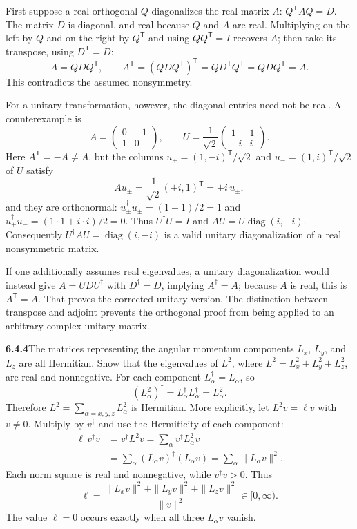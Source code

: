 First suppose a real orthogonal $Q$ diagonalizes the real matrix $A$:
$Q^{\mathsf T}AQ=D$. The matrix $D$ is diagonal, and real because $Q$
and $A$ are real. Multiplying on the left by $Q$ and on the right by
$Q^{\mathsf T}$ and using $QQ^{\mathsf T}=I$ recovers $A$; then take
its transpose, using $D^{\mathsf T}=D$:
\[
A=QDQ^{\mathsf T},\qquad
A^{\mathsf T}=(QDQ^{\mathsf T})^{\mathsf T}
=QD^{\mathsf T}Q^{\mathsf T}=QDQ^{\mathsf T}=A.
\]
This contradicts the assumed nonsymmetry.

For a unitary transformation, however, the diagonal entries need not
be real. A counterexample is
\[
A=\begin{pmatrix}0&-1\\1&0\end{pmatrix},\qquad
U=\frac1{\sqrt2}\begin{pmatrix}1&1\\-i&i\end{pmatrix}.
\]
Here $A^{\mathsf T}=-A\ne A$, but the columns
$u_+=(1,-i)^{\mathsf T}/\sqrt2$ and
$u_-=(1,i)^{\mathsf T}/\sqrt2$ of $U$ satisfy
\[
Au_\pm=\frac1{\sqrt2}(\pm i,1)^{\mathsf T}=\pm i\,u_\pm,
\]
and they are orthonormal: $u_\pm^\dagger u_\pm=(1+1)/2=1$ and
$u_+^\dagger u_-=(1\cdot1+i\cdot i)/2=0$. Thus $U^\dagger U=I$ and
$AU=U\operatorname{diag}(i,-i)$. Consequently
$U^\dagger AU=\operatorname{diag}(i,-i)$ is a valid unitary
diagonalization of a real nonsymmetric matrix.

If one additionally assumes real eigenvalues, a unitary diagonalization
would instead give $A=UDU^\dagger$ with $D^\dagger=D$, implying
$A^\dagger=A$; because $A$ is real, this is $A^{\mathsf T}=A$.
That proves the corrected unitary version. The distinction between
transpose and adjoint prevents the orthogonal proof from being applied
to an arbitrary complex unitary matrix.

\par\bigskip
\noindent\textbf{6.4.4}\quad The matrices representing the angular momentum
components $L_{x}$, $L_{y}$, and $L_{z}$ are all Hermitian. Show that the
eigenvalues of $L^{2}$, where $L^{2}=L_{x}^{2}+L_{y}^{2}+L_{z}^{2}$, are real
and nonnegative.
\solution
For each component $L_\alpha^\dagger=L_\alpha$, so
\[
(L_\alpha^2)^\dagger
=L_\alpha^\dagger L_\alpha^\dagger=L_\alpha^2.
\]
Therefore $L^2=\sum_{\alpha=x,y,z}L_\alpha^2$ is Hermitian.
More explicitly, let $L^2v=\ell v$ with $v\ne0$. Multiply by
$v^\dagger$ and use the Hermiticity of each component:
\begin{align*}
\ell\,v^\dagger v
&=v^\dagger L^2v
=\sum_\alpha v^\dagger L_\alpha^2v\\
&=\sum_\alpha (L_\alpha v)^\dagger(L_\alpha v)
=\sum_\alpha\|L_\alpha v\|^2.
\end{align*}
Each norm square is real and nonnegative, while $v^\dagger v>0$.
Thus
\[
\boxed{\ell=\frac{\|L_xv\|^2+\|L_yv\|^2+\|L_zv\|^2}{\|v\|^2}
\in[0,\infty).}
\]
The value $\ell=0$ occurs exactly when all three $L_\alpha v$ vanish.

